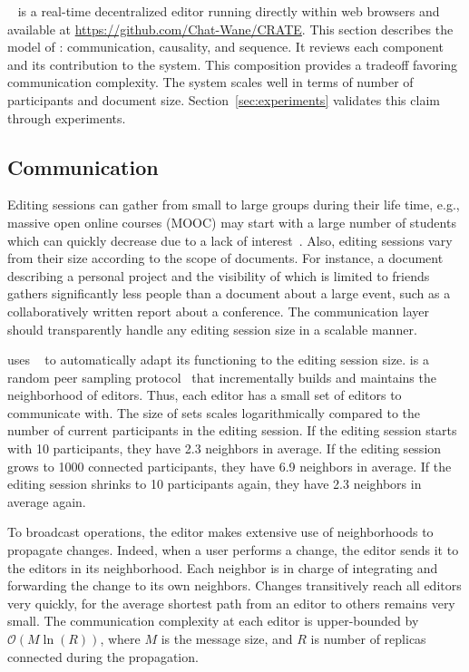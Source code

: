 \CRATE~\cite{nedelec2016crate} is a real-time decentralized editor running
directly within web browsers and available at
\url{https://github.com/Chat-Wane/CRATE}. 
This section describes the model of \CRATE: communication, causality, and
sequence.  It reviews each component and its contribution to the system. This
composition provides a tradeoff favoring communication complexity. The system
scales well in terms of number of participants and document
size. Section~\ref{sec:experiments} validates this claim through experiments.


\subsection{Communication}
\label{subsec:communication}

Editing sessions can gather from small to large groups during their life time,
e.g., massive open online courses (MOOC) may start with a large number of
students which can quickly decrease due to a lack of
interest~\cite{breslow2013studying}. Also, editing sessions vary from their size
according to the scope of documents. For instance, a document describing a
personal project and the visibility of which is limited to friends gathers
significantly less people than a document about a large event, such as a
collaboratively written report about a conference. The communication layer
should transparently handle any editing session size in a scalable manner.


\CRATE uses \SPRAY~\cite{nedelec2015spray} to automatically adapt its
functioning to the editing session size. \SPRAY is a random peer sampling
protocol~\cite{jelasity2007gossip} that incrementally builds and maintains the
neighborhood of editors. Thus, each editor has a small set of editors to
communicate with. The size of sets scales logarithmically compared to the number
of current participants in the editing session. If the editing session starts
with 10 participants, they have 2.3 neighbors in average. If the editing session
grows to 1000 connected participants, they have 6.9 neighbors in average. If the
editing session shrinks to 10 participants again, they have 2.3 neighbors in
average again.

To broadcast operations, the editor makes extensive use of neighborhoods to
propagate changes. Indeed, when a user performs a change, the editor sends it to
the editors in its neighborhood. Each neighbor is in charge of integrating and
forwarding the change to its own neighbors. Changes transitively reach all
editors very quickly, for the average shortest path from an editor to others
remains very small. The communication complexity at each editor is upper-bounded
by $\mathcal{O}(M \ln(R))$, where $M$ is the message size, and $R$ is number of
replicas connected during the propagation.

